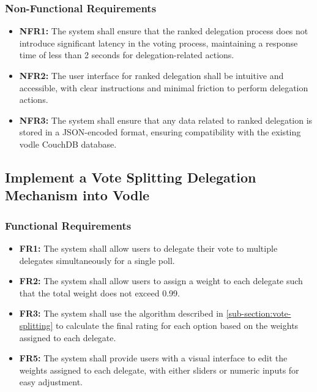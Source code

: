 \subsubsection{Non-Functional Requirements}
\begin{itemize}
    \item \textbf{NFR1:} The system shall ensure that the ranked delegation process does not introduce significant latency in the voting process, maintaining a response time of less than 2 seconds for delegation-related actions.

    \item \textbf{NFR2:} The user interface for ranked delegation shall be intuitive and accessible, with clear instructions and minimal friction to perform delegation actions.
    
    \item \textbf{NFR3:} The system shall ensure that any data related to ranked delegation is stored in a JSON-encoded format, ensuring compatibility with the existing vodle CouchDB database.
\end{itemize}
\subsection{Implement a Vote Splitting Delegation Mechanism into Vodle}
\subsubsection{Functional Requirements}
\begin{itemize}
    \item \textbf{FR1:} The system shall allow users to delegate their vote to multiple delegates simultaneously for a single poll.

    \item \textbf{FR2:} The system shall allow users to assign a weight to each delegate such that the total weight does not exceed 0.99.

    \item \textbf{FR3:} The system shall use the algorithm described in \ref{sub-section:vote-splitting} to calculate the final rating for each option based on the weights assigned to each delegate.

    \item \textbf{FR5:} The system shall provide users with a visual interface to edit the weights assigned to each delegate, with either sliders or numeric inputs for easy adjustment.
\end{itemize}

